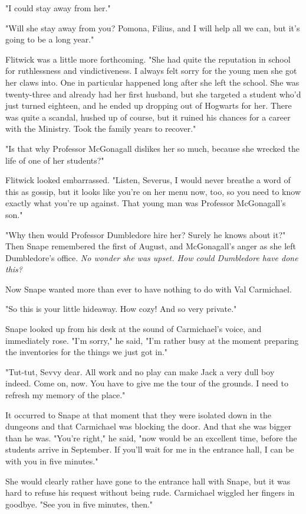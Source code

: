 "I could stay away from her."

"Will she stay away from you? Pomona, Filius, and I will help all we can, but it's going to be a long year."

Flitwick was a little more forthcoming. "She had quite the reputation in school for ruthlessness and vindictiveness. I always felt sorry for the young men she got her claws into. One in particular happened long after she left the school. She was twenty-three and already had her first husband, but she targeted a student who'd just turned eighteen, and he ended up dropping out of Hogwarts for her. There was quite a scandal, hushed up of course, but it ruined his chances for a career with the Ministry. Took the family years to recover."

"Is that why Professor McGonagall dislikes her so much, because she wrecked the life of one of her students?"

Flitwick looked embarrassed. "Listen, Severus, I would never breathe a word of this as gossip, but it looks like you're on her menu now, too, so you need to know exactly what you're up against. That young man{\el} was Professor McGonagall's son."

"Why then would Professor Dumbledore hire her? Surely he knows about it?" Then Snape remembered the first of August, and McGonagall's anger as she left Dumbledore's office. \emph{No wonder she was upset. How could Dumbledore have done this?}

Now Snape wanted more than ever to have nothing to do with Val Carmichael.

"So this is your little hideaway. How cozy! And so very private."

Snape looked up from his desk at the sound of Carmichael's voice, and immediately rose. "I'm sorry," he said, "I'm rather busy at the moment preparing the inventories for the things we just got in."

"Tut-tut, Sevvy dear. All work and no play can make Jack a very dull boy indeed. Come on, now. You have to give me the tour of the grounds. I need to refresh my memory of the place."

It occurred to Snape at that moment that they were isolated down in the dungeons and that Carmichael was blocking the door. And that she was bigger than he was. "You're right," he said, "now would be an excellent time, before the students arrive in September. If you'll wait for me in the entrance hall, I can be with you in five minutes."

She would clearly rather have gone to the entrance hall with Snape, but it was hard to refuse his request without being rude. Carmichael wiggled her fingers in goodbye. "See you in five minutes, then."

